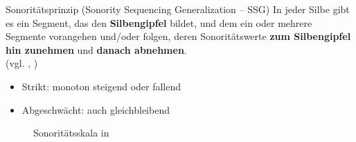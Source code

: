 \begin{frame}


\begin{block}{Sonoritätsprinzip (Sonority Sequencing Generalization -- SSG)}
In jeder Silbe gibt es ein Segment, das den \textbf{Silbengipfel} bildet, und dem ein oder mehrere Segmente vorangehen und/oder folgen, deren Sonoritätswerte \textbf{zum Silbengipfel hin zunehmen} und \textbf{danach abnehmen}.\\
\hfill (vgl. \citealt[225]{Hall00a}, \citealt[94]{Ramers08a})
\end{block}

\begin{itemize}
	\item Strikt: monoton steigend oder fallend
	\item Abgeschwächt: auch gleichbleibend \citep[vgl.][]{Hall00a}

\end{itemize}


\begin{figure}
	\centering
	\caption{Sonoritätsskala in \citet[19]{Lenerz85a}} %
\end{figure}


\end{frame}


